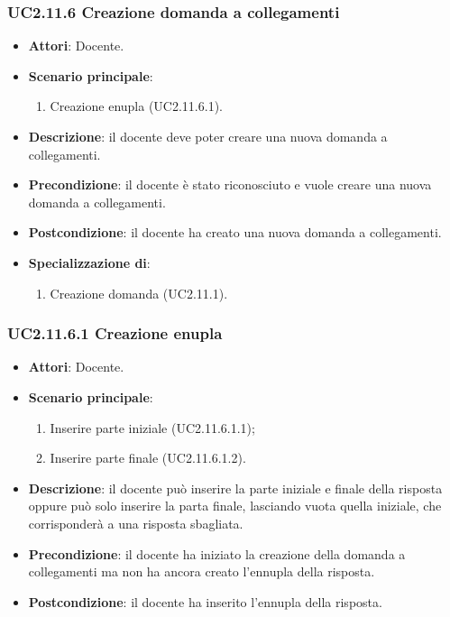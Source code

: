 \subsubsection{UC2.11.6 Creazione domanda a collegamenti}
\begin{itemize}
\item \textbf{Attori}: Docente.
\item \textbf{Scenario principale}:
\begin{enumerate}
\item Creazione enupla (UC2.11.6.1).
\end{enumerate}
\item \textbf{Descrizione}: il docente deve poter creare una nuova domanda a collegamenti.
\item \textbf{Precondizione}: il docente è stato riconosciuto e vuole creare una nuova domanda a collegamenti.
\item \textbf{Postcondizione}: il docente ha creato una nuova domanda a collegamenti.
\item \textbf{Specializzazione di}:
\begin{enumerate}
\item Creazione domanda (UC2.11.1).
\end{enumerate}
\end{itemize}
\subsubsection{UC2.11.6.1 Creazione enupla}
\begin{itemize}
\item \textbf{Attori}: Docente.
\item \textbf{Scenario principale}:
\begin{enumerate}
\item Inserire parte iniziale (UC2.11.6.1.1);
\item Inserire parte finale (UC2.11.6.1.2).
\end{enumerate}
\item \textbf{Descrizione}: il docente può inserire la parte iniziale e finale della risposta oppure può solo inserire la parta finale, lasciando vuota quella iniziale, che corrisponderà a una risposta sbagliata.
\item \textbf{Precondizione}: il docente ha iniziato la creazione della domanda a collegamenti ma non ha ancora creato l'ennupla della risposta.
\item \textbf{Postcondizione}: il docente ha inserito l'ennupla della risposta.
\end{itemize}
